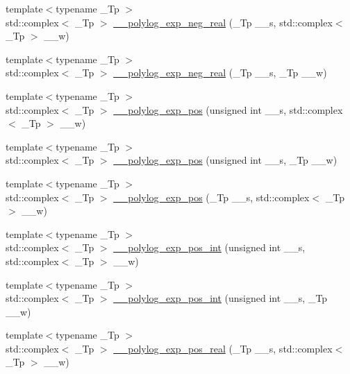 \begin{DoxyCompactItemize}
{\footnotesize template$<$typename \+\_\+\+Tp $>$ }\\std\+::complex$<$ \+\_\+\+Tp $>$ \hyperlink{namespacestd_1_1____detail_a6320926219e1a9a653d9a793c7a3ad37}{\+\_\+\+\_\+polylog\+\_\+exp\+\_\+neg\+\_\+real} (\+\_\+\+Tp \+\_\+\+\_\+s, std\+::complex$<$ \+\_\+\+Tp $>$ \+\_\+\+\_\+w)
\item 
{\footnotesize template$<$typename \+\_\+\+Tp $>$ }\\std\+::complex$<$ \+\_\+\+Tp $>$ \hyperlink{namespacestd_1_1____detail_a65df07847bbb3c92518449fbc5787870}{\+\_\+\+\_\+polylog\+\_\+exp\+\_\+neg\+\_\+real} (\+\_\+\+Tp \+\_\+\+\_\+s, \+\_\+\+Tp \+\_\+\+\_\+w)
\item 
{\footnotesize template$<$typename \+\_\+\+Tp $>$ }\\std\+::complex$<$ \+\_\+\+Tp $>$ \hyperlink{namespacestd_1_1____detail_a0327d2970eba3a0a2d73c71c7a77701c}{\+\_\+\+\_\+polylog\+\_\+exp\+\_\+pos} (unsigned int \+\_\+\+\_\+s, std\+::complex$<$ \+\_\+\+Tp $>$ \+\_\+\+\_\+w)
\item 
{\footnotesize template$<$typename \+\_\+\+Tp $>$ }\\std\+::complex$<$ \+\_\+\+Tp $>$ \hyperlink{namespacestd_1_1____detail_ab13a4be6685dd222b654da3297342d7e}{\+\_\+\+\_\+polylog\+\_\+exp\+\_\+pos} (unsigned int \+\_\+\+\_\+s, \+\_\+\+Tp \+\_\+\+\_\+w)
\item 
{\footnotesize template$<$typename \+\_\+\+Tp $>$ }\\std\+::complex$<$ \+\_\+\+Tp $>$ \hyperlink{namespacestd_1_1____detail_a56b0f5bc6f4955469fd5f83105cbd466}{\+\_\+\+\_\+polylog\+\_\+exp\+\_\+pos} (\+\_\+\+Tp \+\_\+\+\_\+s, std\+::complex$<$ \+\_\+\+Tp $>$ \+\_\+\+\_\+w)
\item 
{\footnotesize template$<$typename \+\_\+\+Tp $>$ }\\std\+::complex$<$ \+\_\+\+Tp $>$ \hyperlink{namespacestd_1_1____detail_a84081b0dd494f4601f2d40768e71b7b4}{\+\_\+\+\_\+polylog\+\_\+exp\+\_\+pos\+\_\+int} (unsigned int \+\_\+\+\_\+s, std\+::complex$<$ \+\_\+\+Tp $>$ \+\_\+\+\_\+w)
\item 
{\footnotesize template$<$typename \+\_\+\+Tp $>$ }\\std\+::complex$<$ \+\_\+\+Tp $>$ \hyperlink{namespacestd_1_1____detail_a6d05f9213f03b1781250cc048739e55b}{\+\_\+\+\_\+polylog\+\_\+exp\+\_\+pos\+\_\+int} (unsigned int \+\_\+\+\_\+s, \+\_\+\+Tp \+\_\+\+\_\+w)
\item 
{\footnotesize template$<$typename \+\_\+\+Tp $>$ }\\std\+::complex$<$ \+\_\+\+Tp $>$ \hyperlink{namespacestd_1_1____detail_a36da38ab2aa8a67c089412937d5a695b}{\+\_\+\+\_\+polylog\+\_\+exp\+\_\+pos\+\_\+real} (\+\_\+\+Tp \+\_\+\+\_\+s, std\+::complex$<$ \+\_\+\+Tp $>$ \+\_\+\+\_\+w)

\end{DoxyCompactItemize}
